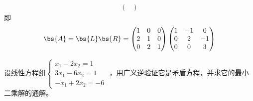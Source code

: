 \documentclass[12pt, a4paper, oneside, UTF8]{ctexbook}
\begin{document}
\begin{solution}
\begin{align*}
\begin{pmatrix}
        \end{pmatrix}
    \end{align*}
    即
    \begin{align*}
        \bs{A}=\bs{L}\bs{R}=\begin{pmatrix}
            1&0&0\\
            2&1&0\\
            0&2&1
        \end{pmatrix}
        \begin{pmatrix}
            1&-1&0\\
            0&2&-1\\
            0&0&3
           \end{pmatrix}
    \end{align*}
\end{solution}

\begin{question}
    设线性方程组$\left\{
        \begin{array}{ll}
            x_1-2x_2=1\\
            3x_1-6x_2=1\\
            -x_1+2x_2=-6
        \end{array}
        \right.$
    ，用广义逆验证它是矛盾方程，并求它的最小二乘解的通解。
\end{question}
\end{document}
